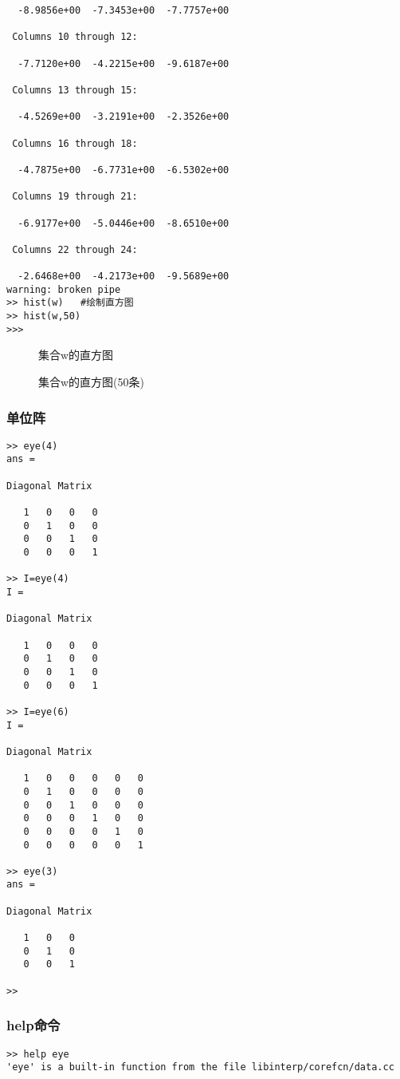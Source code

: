 \documentclass{article}
\begin{document}
\begin{CJK}{UTF8}{gbsn}
\begin{verbatim}
  -8.9856e+00  -7.3453e+00  -7.7757e+00

 Columns 10 through 12:

  -7.7120e+00  -4.2215e+00  -9.6187e+00

 Columns 13 through 15:

  -4.5269e+00  -3.2191e+00  -2.3526e+00

 Columns 16 through 18:

  -4.7875e+00  -6.7731e+00  -6.5302e+00

 Columns 19 through 21:

  -6.9177e+00  -5.0446e+00  -8.6510e+00

 Columns 22 through 24:

  -2.6468e+00  -4.2173e+00  -9.5689e+00
warning: broken pipe
>> hist(w)   #绘制直方图
>> hist(w,50)
>>>
\end{verbatim}
\begin{figure}[H]
\caption{集合w的直方图}
\label{fig:111}
\end{figure}
\begin{figure}[H]
\caption{集合w的直方图(50条)}
\label{fig:112}
\end{figure}
\subsubsection{单位阵}
\begin{verbatim}
>> eye(4)
ans =

Diagonal Matrix

   1   0   0   0
   0   1   0   0
   0   0   1   0
   0   0   0   1

>> I=eye(4)
I =

Diagonal Matrix

   1   0   0   0
   0   1   0   0
   0   0   1   0
   0   0   0   1

>> I=eye(6)
I =

Diagonal Matrix

   1   0   0   0   0   0
   0   1   0   0   0   0
   0   0   1   0   0   0
   0   0   0   1   0   0
   0   0   0   0   1   0
   0   0   0   0   0   1

>> eye(3)
ans =

Diagonal Matrix

   1   0   0
   0   1   0
   0   0   1

>>
\end{verbatim}
\subsubsection{help命令}
\begin{verbatim}
>> help eye
'eye' is a built-in function from the file libinterp/corefcn/data.cc


\end{verbatim}
\end{CJK}
\end{document}
